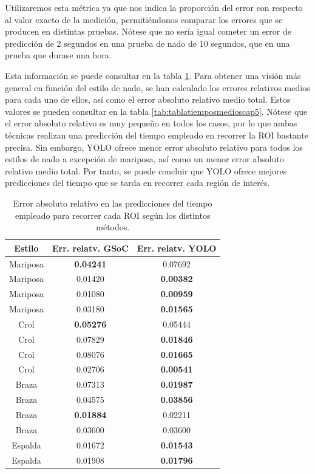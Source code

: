 Utilizaremos esta métrica ya que nos indica la proporción del error con respecto al valor exacto de la medición, permitiéndonos comparar los errores que se producen en distintas pruebas. Nótese que no sería igual cometer un error de predicción de 2 segundos en una prueba de nado de 10 segundos, que en una prueba que durase una hora.

Esta información se puede consultar en la tabla \ref{tab:tablaerrorestiemposcap5}. Para obtener una visión más general en función del estilo de nado, se han calculado los errores relativos medios para cada uno de ellos, así como el error absoluto relativo medio total. Estos valores se pueden consultar en la tabla \ref{tab:tablatiemposmedioscap5}. Nótese que el error absoluto relativo es muy pequeño en todos los casos, por lo que ambas técnicas realizan una predicción del tiempo empleado en recorrer la ROI bastante precisa. Sin embargo, YOLO ofrece menor error absoluto relativo para todos los estilos de nado a excepción de mariposa, así como un menor error absoluto relativo  medio total. Por tanto, se puede concluir que YOLO ofrece mejores predicciones del tiempo que se tarda en recorrer cada región de interés.

\begin{table}[]
    \centering
    \small
    \begin{tabular}{|c|c|c|} \hline
         Estilo & Err. relatv. GSoC & Err. relatv. YOLO  \\ \hline 
         Mariposa & \textbf{0.04241} & 0.07692 \\
         Mariposa & 0.01420 & \textbf{0.00382} \\
         Mariposa & 0.01080 & \textbf{0.00959} \\
         Mariposa & 0.03180 & \textbf{0.01565} \\
         Crol & \textbf{0.05276} & 0.05444 \\
         Crol & 0.07829 & \textbf{0.01846} \\
         Crol & 0.08076 & \textbf{0.01665} \\
         Crol & 0.02706 & \textbf{0.00541} \\
         Braza & 0.07313 & \textbf{0.01987} \\
         Braza & 0.04575 & \textbf{0.03856} \\
         Braza & \textbf{0.01884} & 0.02211 \\
         Braza & 0.03600 & 0.03600 \\
         Espalda & 0.01672 & \textbf{0.01543} \\
         Espalda & 0.01908 & \textbf{0.01796} \\ \hline
    \end{tabular}
    \caption{Error absoluto relativo en las predicciones del tiempo empleado para recorrer cada ROI según los distintos métodos. }
    \label{tab:tablaerrorestiemposcap5}
\end{table}

